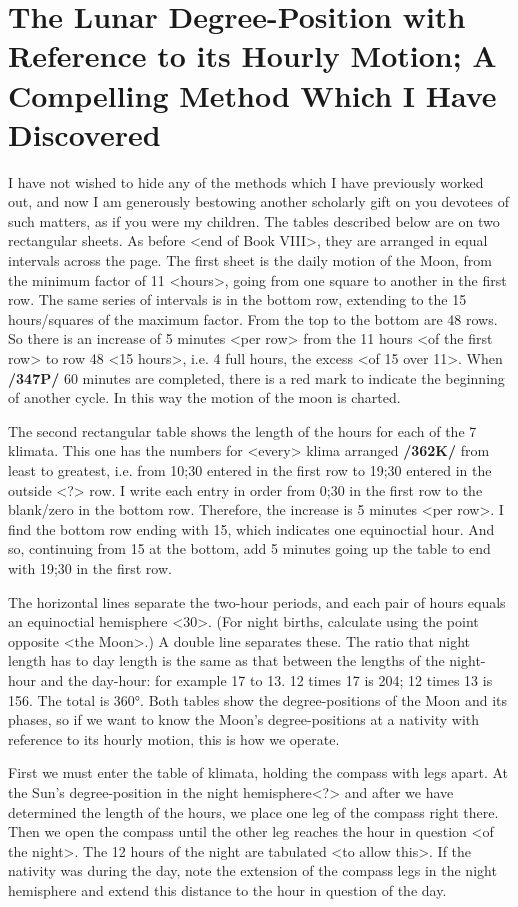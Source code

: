 \section{The Lunar Degree-Position with Reference to its Hourly Motion; A Compelling Method Which I Have Discovered}

I have not wished to hide any of the methods which I have previously worked out, and now I am generously bestowing another scholarly gift on you devotees of such matters, as if you were my children. The tables described below are on two rectangular sheets. As before <end of Book VIII>, they are arranged in equal intervals across the page. The first sheet is the daily motion of the Moon, from the minimum
factor of 11 <hours>, going from one square to another in the first row. The same series of intervals is in the bottom row, extending to the 15 hours/squares of the maximum factor. From the top to the bottom are 48 rows. So there is an increase of 5 minutes <per row> from the 11 hours <of the first row> to row 48 <15 hours>, i.e. 4 full hours, the excess <of 15 over 11>. When \textbf{/347P/} 60 minutes are completed, there is a red mark to indicate the beginning of another cycle. In this way the motion of the moon is charted.

The second rectangular table shows the length of the hours for each of the 7 klimata. This one has the numbers for <every> klima arranged \textbf{/362K/} from least to greatest, i.e. from 10;30 entered in the first row to 19;30 entered in the outside <?> row. I write each entry in order from 0;30 in the first row to the blank/zero in the bottom row. Therefore, the increase is 5 minutes <per row>. I find the bottom row ending with 15, which indicates one equinoctial hour. And so, continuing from 15 at the bottom, add 5 minutes going up the table to end with 19;30 in the first row.

The horizontal lines separate the two-hour periods, and each pair of hours equals an equinoctial hemisphere <30>. (For night births, calculate using the point opposite <the Moon>.) A double line
separates these. The ratio that night length has to day length is the same as that between the lengths of the night-hour and the day-hour: for example 17 to 13. 12 times 17 is 204; 12 times 13 is 156. The total is 360°. Both tables show the degree-positions of the Moon and its phases, so if we want to know the Moon’s degree-positions at a nativity with reference to its hourly motion, this is how we operate. 

First we must enter the table of klimata, holding the compass with legs apart. At the Sun’s degree-position in the night hemisphere<?> and after we have determined the length of the hours, we place one leg of the compass right there. Then we open the compass until the other leg reaches the hour in question <of the night>. The 12 hours of the night are tabulated <to allow this>. If the nativity was during the day, note the extension of the compass legs in the night hemisphere and extend this distance to the hour in question of the day.

